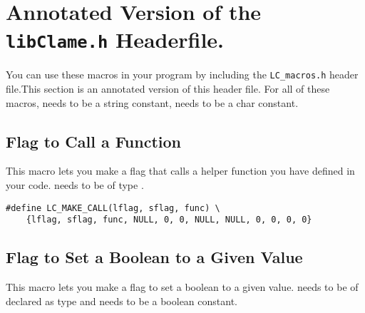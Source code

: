 %
%
%

\section{Annotated Version of the \texttt{libClame.h} Headerfile.}

You can use these macros in your program by including the \texttt{LC_macros.h} header file.\footnotemark This section is an annotated version of this header file. For all of these macros,  needs to be a string constant,  needs to be a char constant.


\subsection{Flag to Call a Function}
This macro lets you make a flag that calls a helper function you have defined in your code.  needs to be of type .\footnotemark


\begin{verbatim}
#define LC_MAKE_CALL(lflag, sflag, func) \
	{lflag, sflag, func, NULL, 0, 0, NULL, NULL, 0, 0, 0, 0}
\end{verbatim}

\subsection{Flag to Set a Boolean to a Given Value}
This macro lets you make a flag to set a boolean to a given value.  needs to be of declared as type  and  needs to be a boolean constant.

